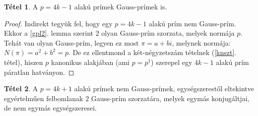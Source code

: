\documentclass[12pt]{book}
\theoremstyle{plain} %
\theoremstyle{definition} %
\newtheorem{theo/}{Tétel}[section]
\newenvironment{theo}
  {\renewcommand{\qedsymbol}{$\clubsuit$}%
   \pushQED{\qed}\begin{theo/}}
  {\popQED\end{theo/}}
\theoremstyle{remark}
\renewcommand\qedsymbol{$\blacksquare$}
\numberwithin{equation}{section}  %
\begin{document}
	\begin{theo}
		A $p=4k-1$ alakú prímek Gauss-prímek is.
	\end{theo}

	\begin{proof}
		Indirekt tegyük fel, hogy egy $p=4k-1$ alakú prím nem Gauss-prím. Ekkor a \ref{gpl2}. lemma szerint $2$ olyan Gauss-prím szorzata, melyek normája $p$. Tehát van olyan Gauss-prím, legyen ez most $\pi = a+bi$, melynek normája: $N(\pi)= a^2 + b^2 = p$. De ez ellentmond a két-négyzetszám tételnek (\ref{knszt}. tétel), hiszen $p$ kanonikus alakjában (ami $p = p^1$) szerepel egy $4k-1$ alakú prím páratlan hatványon.
	\end{proof}
	
	\begin{theo}\label{4kp1}
		A $p=4k+1$ alakú prímek nem Gauss-prímek, egységszerestől eltekintve egyértelműen felbomlanak $2$ Gauss-prím szorzatára, melyek egymás konjugáltjai, de nem egymás egységszeresei.
	\end{theo}
\end{document}

